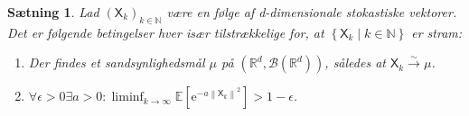 \documentclass{article}
\newcommand{\1}{\mathbbm{1}}
\newcommand{\X}{\mathsf{X}}
\theoremstyle{boxed}
\newtheorem{proposition}[theorem]{Sætning}
\begin{document}
\begin{theorem-box}
    \begin{proposition}
        Lad $\left(\X_k\right)_{k \in \mathbb{N}}$ være en følge af d-dimensionale stokastiske vektorer.
Det er følgende betingelser hver især tilstrækkelige for, at $\left\{\X_k \mid k \in \mathbb{N}\right\}$ er stram:
\begin{enumerate}
    \item[\textnormal{(i)}] Der findes et sandsynlighedsmål $\mu$ på $\left(\mathbb{R}^d, \mathcal{B}\left(\mathbb{R}^d\right)\right)$, således at $\X_k \xrightarrow{\sim} \mu$.
    \item[\textnormal{(ii)}] $\forall \epsilon>0 \exists a>0: \liminf _{k \rightarrow \infty} \mathbb{E}\left[\mathrm{e}^{-a\left\|\X_k\right\|^2}\right]>1-\epsilon$. 
\end{enumerate}
    \end{proposition}
\end{theorem-box}
\end{document}
